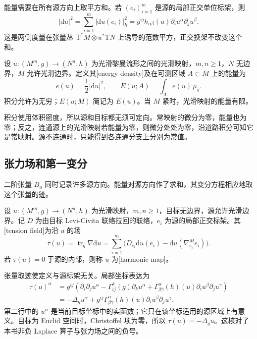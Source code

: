 能量需要在所有源方向上取平方和。若 \((e_i)_{i=1}^m\) 是源的局部正交单位标架，则
\[
	|\mathrm du|^2=\sum_{i=1}^m|\mathrm du(e_i)|_h^2
	=g^{ij}h_{\alpha\beta}(u)\partial_i u^\alpha\partial_j u^\beta.
\]
这是两侧度量在张量丛 \(\mathrm T^*M\otimes u^*\mathrm TN\) 上诱导的范数平方，正交换架不改变这个和。
\begin{definition}\label{g3:def:map-energy}
	设 \(u:(M^m,g)\to(N^n,h)\) 为光滑黎曼流形之间的光滑映射，\(m,n\ge1\)，\(N\) 无边界，\(M\) 允许光滑边界。定义其[energy density]及在可测区域 \(A\subset M\) 上的能量为
	\begin{equation}\label{g3:eq:map-energy}
		e(u)=\frac12|\mathrm du|^2,\qquad
		E(u;A)=\int_A e(u)\,\mu_g.
	\end{equation}
	积分允许为无穷；\(E(u;M)\) 简记为 \(E(u)\)。当 \(M\) 紧时，光滑映射的能量有限。
\end{definition}
积分使用体积密度，所以源和目标都无须可定向。常映射的微分为零，能量也为零；反之，连通源上的光滑映射若能量为零，则微分处处为零，沿道路积分可知它是常映射。源不连通时，只能得到各连通分支上分别为常值。

\subsection{张力场和第一变分}
\label{g3:subsec:1801:02}
二阶张量 \(B_u\) 同时记录许多源方向。能量对源方向作了求和，其变分方程相应地取这个张量的迹。
\begin{definition}\label{g3:def:tension-harmonic-map}
	设 \(u:(M^m,g)\to(N^n,h)\) 为光滑映射，\(m,n\ge1\)，目标无边界，源允许光滑边界。记 \(D\) 为由目标 Levi-Civita 联络拉回的联络，\(e_i\) 为源的局部正交标架。其[tension field]为沿 \(u\) 的场
	\begin{equation}\label{g3:eq:tension-definition}
		\tau(u)=\operatorname{tr}_g\nabla\mathrm du
		=\sum_{i=1}^m\bigl(D_{e_i}\mathrm du(e_i)-\mathrm du(\nabla^M_{e_i}e_i)\bigr).
	\end{equation}
	若 \(\tau(u)=0\) 于源的内部，则称 \(u\) 为[harmonic map]。
\end{definition}
张量取迹使定义与源标架无关。局部坐标表达为
\begin{equation}\label{g3:eq:tension-coordinates}
	\begin{aligned}
		\tau(u)^\alpha
		&=g^{ij}\left(\partial_i\partial_j u^\alpha
		-\Gamma^k_{ij}(g)\partial_k u^\alpha
		+\Gamma^\alpha_{\beta\gamma}(h)(u)\partial_i u^\beta\partial_j u^\gamma\right)\\
		&=-\Delta_g u^\alpha
		+g^{ij}\Gamma^\alpha_{\beta\gamma}(h)(u)\partial_i u^\beta\partial_j u^\gamma.
	\end{aligned}
\end{equation}
第二行中的 \(u^\alpha\) 是当前目标坐标中的实函数；它只在该坐标适用的源区域上有意义。目标为 Euclid 空间时，Christoffel 项为零，所以 \(\tau(u)=-\Delta_g u\)。这核对了本书非负 Laplace 算子与张力场之间的负号。

